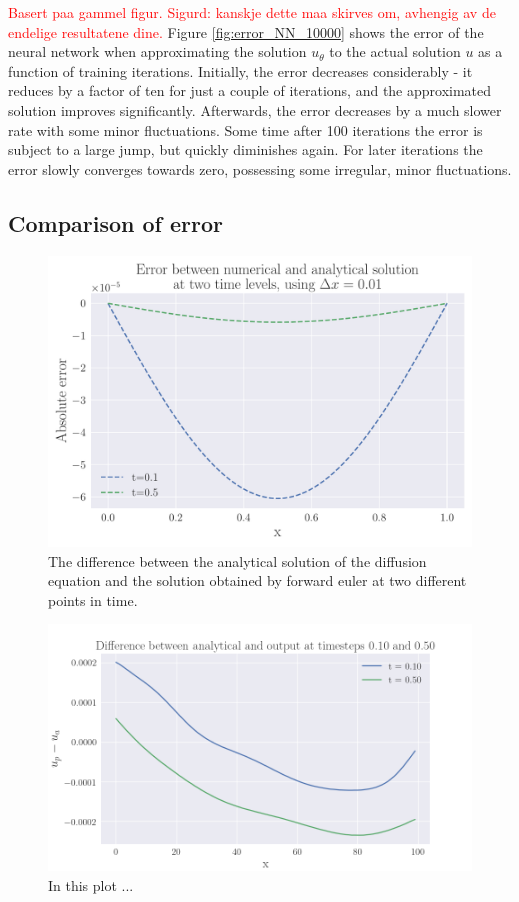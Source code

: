 \documentclass[12pt]{extarticle}
\begin{document}
\textcolor{red}{Basert paa gammel figur. Sigurd: kanskje dette maa skirves om, avhengig av de endelige resultatene dine.}
Figure \ref{fig:error_NN_10000} shows the error of the neural network when approximating the solution $u_{\theta}$ to the actual solution $u$ as a function of training iterations. Initially, the error decreases considerably - it reduces by a factor of ten for just a couple of iterations, and the approximated solution improves significantly. Afterwards, the error decreases by a much slower rate with some minor fluctuations. Some time after 100 iterations the error is subject to a large jump, but quickly diminishes again. For later iterations the error slowly converges towards zero, possessing some irregular, minor fluctuations. 


\subsection{Comparison of error}

\begin{figure}[h]
	\centering
	\includegraphics[scale=0.6]{../output/plots/error_FE_x_dx_0.01.pdf}
	\caption{The difference between the analytical solution of the diffusion equation and the solution obtained by forward euler at two different points in time.}
	\label{fig:FE_absolute_difference}
\end{figure}


\begin{figure}[h]
	\centering
	\includegraphics[width=\linewidth]{../output/plots/final_compare_NN.png}
	\caption{In this plot ...} \label{fig:NN_relative_error}
\end{figure}
\end{document}
